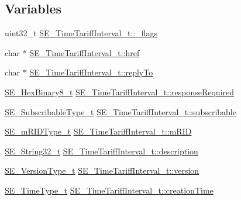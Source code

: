\subsection*{Variables}
\begin{DoxyCompactItemize}
\item 
uint32\+\_\+t \hyperlink{group__TimeTariffInterval_ga7b1863546f7a8bbfb0967abf77ab16be}{S\+E\+\_\+\+Time\+Tariff\+Interval\+\_\+t\+::\+\_\+flags}
\item 
char $\ast$ \hyperlink{group__TimeTariffInterval_ga9ecb16673577ea0905ad798cff6cddb9}{S\+E\+\_\+\+Time\+Tariff\+Interval\+\_\+t\+::href}
\item 
char $\ast$ \hyperlink{group__TimeTariffInterval_gadf4d995cb58644749ea7dd25109c6290}{S\+E\+\_\+\+Time\+Tariff\+Interval\+\_\+t\+::reply\+To}
\item 
\hyperlink{group__HexBinary8_gaecf2dab3615fb954a693c017a61f77d6}{S\+E\+\_\+\+Hex\+Binary8\+\_\+t} \hyperlink{group__TimeTariffInterval_ga6c820fb8d5ca8941778d1d1b72a8db5f}{S\+E\+\_\+\+Time\+Tariff\+Interval\+\_\+t\+::response\+Required}
\item 
\hyperlink{group__SubscribableType_ga5c41f553d369710ed34619266bf2551e}{S\+E\+\_\+\+Subscribable\+Type\+\_\+t} \hyperlink{group__TimeTariffInterval_ga204d201f3d7f068145fe48b0cf6fef15}{S\+E\+\_\+\+Time\+Tariff\+Interval\+\_\+t\+::subscribable}
\item 
\hyperlink{group__mRIDType_gac74622112f3a388a2851b2289963ba5e}{S\+E\+\_\+m\+R\+I\+D\+Type\+\_\+t} \hyperlink{group__TimeTariffInterval_ga5dfc94691e8bcb18eeecf048476778ee}{S\+E\+\_\+\+Time\+Tariff\+Interval\+\_\+t\+::m\+R\+ID}
\item 
\hyperlink{group__String32_gac9f59b06b168b4d2e0d45ed41699af42}{S\+E\+\_\+\+String32\+\_\+t} \hyperlink{group__TimeTariffInterval_gad1653c4c0d6ff772fef6371d9c18aa8b}{S\+E\+\_\+\+Time\+Tariff\+Interval\+\_\+t\+::description}
\item 
\hyperlink{group__VersionType_ga4b8d27838226948397ed99f67d46e2ae}{S\+E\+\_\+\+Version\+Type\+\_\+t} \hyperlink{group__TimeTariffInterval_ga1dcb279f5b9a99f365184999dcf4183f}{S\+E\+\_\+\+Time\+Tariff\+Interval\+\_\+t\+::version}
\item 
\hyperlink{group__TimeType_ga6fba87a5b57829b4ff3f0e7638156682}{S\+E\+\_\+\+Time\+Type\+\_\+t} \hyperlink{group__TimeTariffInterval_gafda795062f9aa229e86753763e549e2f}{S\+E\+\_\+\+Time\+Tariff\+Interval\+\_\+t\+::creation\+Time}
\item 
\mbox{\label{group__TimeTariffInterval_ga7a8b1b324ffabbf2840f4671d265288c}} 

\end{DoxyCompactItemize}
